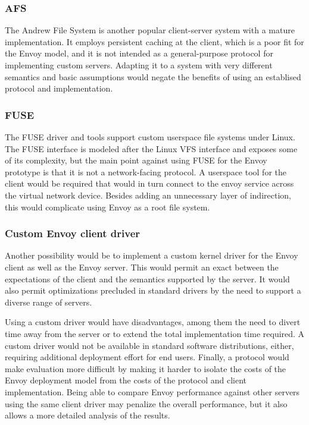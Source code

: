 \subsubsection{AFS}

The Andrew File System is another popular client-server system with a mature implementation. It employs persistent caching at the client, which is a poor fit for the Envoy model, and it is not intended as a general-purpose protocol for implementing custom servers. Adapting it to a system with very different semantics and basic assumptions would negate the benefits of using an establised protocol and implementation.

\subsubsection{FUSE}

The FUSE driver and tools support custom userspace file systems under Linux. The FUSE interface is modeled after the Linux VFS interface and exposes some of its complexity, but the main point against using FUSE for the Envoy prototype is that it is not a network-facing protocol. A userspace tool for the client would be required that would in turn connect to the envoy service across the virtual network device. Besides adding an unnecessary layer of indirection, this would complicate using Envoy as a root file system.

\subsubsection{Custom Envoy client driver}

Another possibility would be to implement a custom kernel driver for the Envoy client as well as the Envoy server. This would permit an exact between the expectations of the client and the semantics supported by the server. It would also permit optimizations precluded in standard drivers by the need to support a diverse range of servers.

Using a custom driver would have disadvantages, among them the need to divert time away from the server or to extend the total implementation time required. A custom driver would not be available in standard software distributions, either, requiring additional deployment effort for end users. Finally, a protocol would make evaluation more difficult by making it harder to isolate the costs of the Envoy deployment model from the costs of the protocol and client implementation. Being able to compare Envoy performance against other servers using the same client driver may penalize the overall performance, but it also allows a more detailed analysis of the results.

